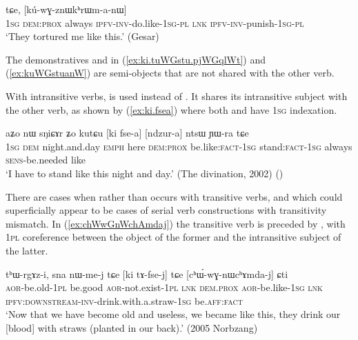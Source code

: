 \begin{exe}
\ex \label{ex:kuWGstuanW}
 tɕe, [kú-wɣ-znɯkʰrɯm-a-nɯ] \\
 \textsc{1sg} \textsc{dem}:\textsc{prox} always \textsc{ipfv}-\textsc{inv}-do.like-\textsc{1sg}-\textsc{pl} \textsc{lnk} \textsc{ipfv}-\textsc{inv}-punish-\textsc{1sg}-\textsc{pl} \\
 \glt `They tortured me like this.' (Gesar)
\end{exe}	

The demonstratives  and  in (\ref{ex:ki.tuWGstu.pjWGqlWt}) and (\ref{ex:kuWGstuanW}) are semi-objects that are not shared with the other verb.

With intransitive verbs,  is used instead of . It shares its intransitive subject with the other verb, as shown by (\ref{ex:ki.fsea}) where both  and  have \textsc{1sg} indexation.

\begin{exe}
\ex \label{ex:ki.fsea}
\gll aʑo nɯ sŋiɕɤr ʑo kutɕu [ki fse-a] [ndzur-a] ntsɯ ɲɯ-ra tɕe \\
\textsc{1sg} \textsc{dem} night.and.day \textsc{emph} here \textsc{dem}:\textsc{prox} be.like:\textsc{fact}-\textsc{1sg} stand:\textsc{fact}-\textsc{1sg} always \textsc{sens}-be.needed like \\
\glt `I have to stand like this night and day.' (The divination, 2002)
()
\end{exe}

There are cases when  rather than  occurs with transitive verbs, and which could superficially appear to be cases of serial verb constructions with transitivity mismatch.  In (\ref{ex:chWwGnWchAmdaj}) the transitive verb  is preceded by , with \textsc{1pl} coreference between the object of the former and the intransitive subject of the latter. 

\begin{exe}
\ex \label{ex:chWwGnWchAmdaj}
\gll tʰɯ-rgɤz-i, sna nɯ-me-j tɕe [ki tɤ-fse-j] tɕe [cʰɯ́-wɣ-nɯcʰɤmda-j] ɕti  \\
\textsc{aor}-be.old-\textsc{1pl} be.good \textsc{aor}-not.exist-\textsc{1pl} \textsc{lnk} \textsc{dem}.\textsc{prox} \textsc{aor}-be.like-\textsc{1sg} \textsc{lnk} \textsc{ipfv}:\textsc{downstream}-\textsc{inv}-drink.with.a.straw-\textsc{1sg} be.\textsc{aff}:\textsc{fact} \\
\glt `Now that we have become old and useless, we became like this, they drink our [blood] with straws (planted in our back).' (2005 Norbzang)
\end{exe}

